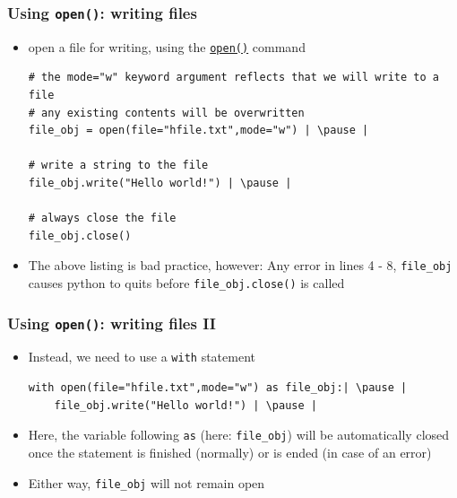 \documentclass[xcolor=table]{beamer}
\begin{document}

\begin{frame}[fragile]
    \frametitle{Using \texttt{open()}: writing files}
\begin{itemize}
    \item open a file for writing, using the \href{https://docs.python.org/3/library/functions.html\#open}{\texttt{open()}} command \pause
\begin{lstlisting}[style=python]
# the mode="w" keyword argument reflects that we will write to a file
# any existing contents will be overwritten
file_obj = open(file="hfile.txt",mode="w") | \pause |

# write a string to the file
file_obj.write("Hello world!") | \pause |

# always close the file
file_obj.close()
\end{lstlisting}
    \item The above listing is bad practice, however: Any error in lines 4 - 8, \texttt{file\_obj} causes python to quits before \texttt{file\_obj.close()} is called
\end{itemize}
\end{frame}

\begin{frame}[fragile]
    \frametitle{Using \texttt{open()}: writing files II}
\begin{itemize}
    \item Instead, we need to use a \texttt{with} statement \pause
\begin{lstlisting}[style=python]
with open(file="hfile.txt",mode="w") as file_obj:| \pause |
    file_obj.write("Hello world!") | \pause |
\end{lstlisting}
    \item Here, the variable following \texttt{as} (here: \texttt{file\_obj}) will be automatically closed once the statement is finished (normally) or is ended (in case of an error)
    \item Either way, \texttt{file\_obj} will not remain open
\end{itemize}
\end{frame}
\end{document}
